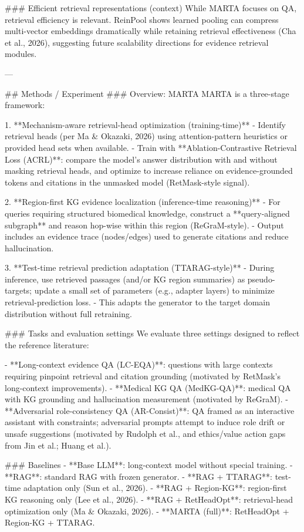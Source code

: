 ### Efficient retrieval representations (context)  
While MARTA focuses on QA, retrieval efficiency is relevant. ReinPool shows learned pooling can compress multi-vector embeddings dramatically while retaining retrieval effectiveness (Cha et al., 2026), suggesting future scalability directions for evidence retrieval modules.

---

## Methods / Experiment  
### Overview: MARTA  
MARTA is a three-stage framework:

1. **Mechanism-aware retrieval-head optimization (training-time)**  
   - Identify retrieval heads (per Ma & Okazaki, 2026) using attention-pattern heuristics or provided head sets when available.  
   - Train with **Ablation-Contrastive Retrieval Loss (ACRL)**: compare the model’s answer distribution with and without masking retrieval heads, and optimize to increase reliance on evidence-grounded tokens and citations in the unmasked model (RetMask-style signal).

2. **Region-first KG evidence localization (inference-time reasoning)**  
   - For queries requiring structured biomedical knowledge, construct a **query-aligned subgraph** and reason hop-wise within this region (ReGraM-style).  
   - Output includes an evidence trace (nodes/edges) used to generate citations and reduce hallucination.

3. **Test-time retrieval prediction adaptation (TTARAG-style)**  
   - During inference, use retrieved passages (and/or KG region summaries) as pseudo-targets; update a small set of parameters (e.g., adapter layers) to minimize retrieval-prediction loss.  
   - This adapts the generator to the target domain distribution without full retraining.

### Tasks and evaluation settings  
We evaluate three settings designed to reflect the reference literature:

- **Long-context evidence QA (LC-EQA)**: questions with large contexts requiring pinpoint retrieval and citation grounding (motivated by RetMask’s long-context improvements).  
- **Medical KG QA (MedKG-QA)**: medical QA with KG grounding and hallucination measurement (motivated by ReGraM).  
- **Adversarial role-consistency QA (AR-Consist)**: QA framed as an interactive assistant with constraints; adversarial prompts attempt to induce role drift or unsafe suggestions (motivated by Rudolph et al., and ethics/value action gaps from Jin et al.; Huang et al.).

### Baselines  
- **Base LLM**: long-context model without special training.  
- **RAG**: standard RAG with frozen generator.  
- **RAG + TTARAG**: test-time adaptation only (Sun et al., 2026).  
- **RAG + Region-KG**: region-first KG reasoning only (Lee et al., 2026).  
- **RAG + RetHeadOpt**: retrieval-head optimization only (Ma & Okazaki, 2026).  
- **MARTA (full)**: RetHeadOpt + Region-KG + TTARAG.

